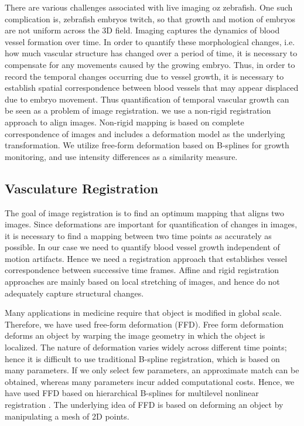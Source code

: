 There are various challenges associated with live imaging oz zebrafish. One such complication is, zebrafish embryos twitch, so that growth and motion of embryos are not uniform across the 3D field. Imaging captures the dynamics of blood vessel formation over time. In order to quantify these morphological changes, i.e. how much vascular structure has changed over a period of time, it is necessary to compensate for any movements caused by the growing embryo. Thus, in order to record the temporal changes occurring due to vessel growth, it is necessary to establish spatial correspondence between blood vessels that may appear displaced due to embryo movement. Thus quantification of temporal vascular growth can be seen as a problem of image registration. we use a non-rigid registration approach to align images. Non-rigid mapping is based on complete correspondence of images and includes a deformation model as the underlying transformation. We utilize free-form deformation based on B-splines for growth monitoring, and use intensity differences as a similarity measure.  

\subsection{Vasculature Registration}
The goal of image registration is to find an optimum mapping that aligns two images. Since deformations are important for quantification of changes in images, it is necessary to find a mapping between two time points as accurately as possible. In our case we need to quantify blood vessel growth independent of motion artifacts.  Hence we need a registration approach that establishes vessel correspondence between successive time frames. Affine and rigid registration approaches are mainly based on local stretching of images, and hence do not adequately capture structural changes.

Many applications in medicine require that object is modified in global scale. Therefore, we have used free-form deformation (FFD). Free form deformation deforms an object by warping the image geometry in which the object is localized. The nature of deformation varies widely across different time points; hence it is difficult to use traditional B-spline registration, which is based on many parameters. If we only select few parameters, an approximate match can be obtained, whereas many parameters incur added computational costs. Hence, we have used FFD based on hierarchical B-splines for multilevel nonlinear registration \cite{Lee97}. The underlying idea of FFD is based on deforming an object by manipulating a mesh of 2D points.

